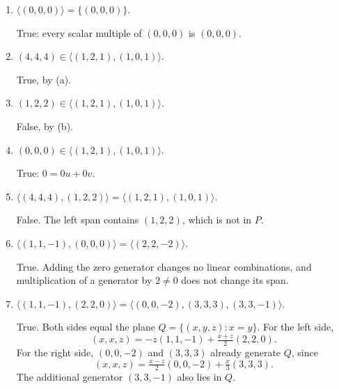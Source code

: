 \begin{enumerate}[label=\alph*)]
\begin{answer}
False: $0\in\langle(3,0,-1)\rangle$ but $0\notin\{(3,0,-1)\}$.
\end{answer}

\item $\langle(0,0,0)\rangle=\{(0,0,0)\}$.

\begin{answer}
True: every scalar multiple of $(0,0,0)$ is $(0,0,0)$.
\end{answer}

\item $(4,4,4)\in\langle(1,2,1),(1,0,1)\rangle$.

\begin{answer}
True, by (a).
\end{answer}

\item $(1,2,2)\in\langle(1,2,1),(1,0,1)\rangle$.

\begin{answer}
False, by (b).
\end{answer}

\item $(0,0,0)\in\langle(1,2,1),(1,0,1)\rangle$.

\begin{answer}
True: $0=0u+0v$.
\end{answer}

\item $\langle(4,4,4),(1,2,2)\rangle=\langle(1,2,1),(1,0,1)\rangle$.

\begin{answer}
False. The left span contains $(1,2,2)$, which is not in $P$.
\end{answer}

\item $\langle(1,1,-1),(0,0,0)\rangle=\langle(2,2,-2)\rangle$.

\begin{answer}
True. Adding the zero generator changes no linear combinations,
and multiplication of a generator by $2\ne0$ does not change its span.
\end{answer}

\item $\langle(1,1,-1),(2,2,0)\rangle=\langle(0,0,-2),(3,3,3),(3,3,-1)\rangle$.

\begin{answer}
True. Both sides equal the plane
$Q=\{(x,y,z):x=y\}$. For the left side,
\[
 (x,x,z)=-z(1,1,-1)+\tfrac{x+z}{2}(2,2,0).
\]
For the right side, $(0,0,-2)$ and $(3,3,3)$ already generate $Q$, since
\[
 (x,x,z)=\tfrac{x-z}{2}(0,0,-2)+\tfrac x3(3,3,3).
\]
The additional generator $(3,3,-1)$ also lies in $Q$.
\end{answer}


\end{enumerate}

